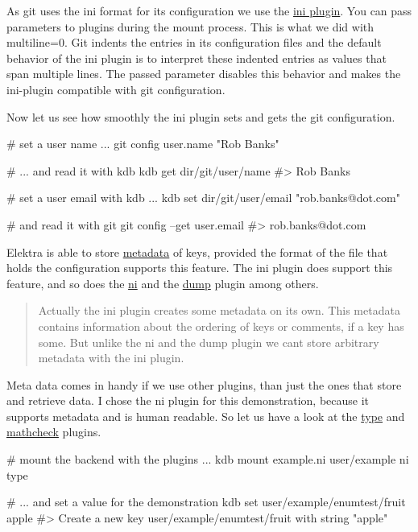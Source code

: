 As git uses the {\ttfamily ini} format for its configuration we use the \hyperlink{autotoc_md289_src_plugins_ini_README_md}{ini plugin}. You can pass parameters to plugins during the mount process. This is what we did with {\ttfamily multiline=0}. Git indents the entries in its configuration files and the default behavior of the {\ttfamily ini} plugin is to interpret these indented entries as values that span multiple lines. The passed parameter disables this behavior and makes the ini-\/plugin compatible with git configuration.

Now let us see how smoothly the ini plugin sets and gets the git configuration.


\begin{DoxyCode}
# set a user name ...
git config user.name "Rob Banks"

# ... and read it with kdb
kdb get dir/git/user/name
#> Rob Banks

# set a user email with kdb ...
kdb set dir/git/user/email "rob.banks@dot.com"

# and read it with git
git config --get user.email
#> rob.banks@dot.com
\end{DoxyCode}


Elektra is able to store \hyperlink{doc_help_elektra-metadata_md}{metadata} of keys, provided the format of the file that holds the configuration supports this feature. The ini plugin does support this feature, and so does the \hyperlink{autotoc_md502_src_plugins_ni_README_md}{ni} and the \hyperlink{autotoc_md193_src_plugins_dump_README_md}{dump} plugin among others.

\begin{quote}
Actually the ini plugin creates some metadata on its own. This metadata contains information about the ordering of keys or comments, if a key has some. But unlike the ni and the dump plugin we can\textquotesingle{}t store arbitrary metadata with the ini plugin. \end{quote}


Meta data comes in handy if we use other plugins, than just the ones that store and retrieve data. I chose the {\ttfamily ni} plugin for this demonstration, because it supports metadata and is human readable. So let us have a look at the \hyperlink{autotoc_md803_src_plugins_type_README_md}{type} and \hyperlink{autotoc_md401_src_plugins_mathcheck_README_md}{mathcheck} plugins.


\begin{DoxyCode}
# mount the backend with the plugins ...
kdb mount example.ni user/example ni type

# ... and set a value for the demonstration
kdb set user/example/enumtest/fruit apple
#> Create a new key user/example/enumtest/fruit with string "apple"
\end{DoxyCode}


